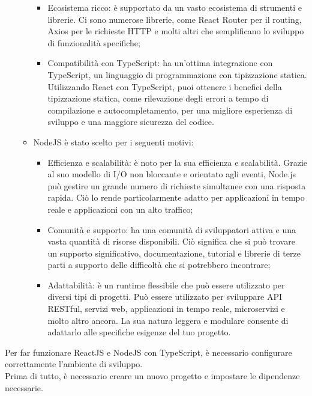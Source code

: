 \documentclass[a4paper, 12pt]{article}
\begin{document}
\begin{itemize}
\begin{itemize}
\begin{itemize}
            \item Ecosistema ricco: è supportato da un vasto ecosistema di strumenti e librerie. Ci sono numerose librerie, come React Router per il routing, Axios per le richieste HTTP e molti altri che semplificano lo sviluppo di funzionalità specifiche;
            \item Compatibilità con TypeScript: ha un'ottima integrazione con TypeScript, un linguaggio di programmazione con tipizzazione statica. Utilizzando React con TypeScript, puoi ottenere i benefici della tipizzazione statica, come rilevazione degli errori a tempo di compilazione e autocompletamento, per una migliore esperienza di sviluppo e una maggiore sicurezza del codice.
        \end{itemize}
        \item NodeJS è stato scelto per i seguenti motivi:
        \begin{itemize}
            \item Efficienza e scalabilità: è noto per la sua efficienza e scalabilità. Grazie al suo modello di I/O non bloccante e orientato agli eventi, Node.js può gestire un grande numero di richieste simultanee con una risposta rapida. Ciò lo rende particolarmente adatto per applicazioni in tempo reale e applicazioni con un alto traffico;
            \item Comunità e supporto: ha una comunità di sviluppatori attiva e una vasta quantità di risorse disponibili. Ciò significa che si può trovare un supporto significativo, documentazione, tutorial e librerie di terze parti a supporto delle difficoltà che si potrebbero incontrare;
            \item Adattabilità: è un runtime flessibile che può essere utilizzato per diversi tipi di progetti. Può essere utilizzato per sviluppare API RESTful, servizi web, applicazioni in tempo reale, microservizi e molto altro ancora. La sua natura leggera e modulare consente di adattarlo alle specifiche esigenze del tuo progetto.
        \end{itemize}
    \end{itemize}
\end{itemize}
\vspace*{0.5cm}
Per far funzionare ReactJS e NodeJS con TypeScript, è necessario configurare correttamente l'ambiente di sviluppo.\\
Prima di tutto, è necessario creare un nuovo progetto e impostare le dipendenze necessarie.\\ \\
\end{document}
